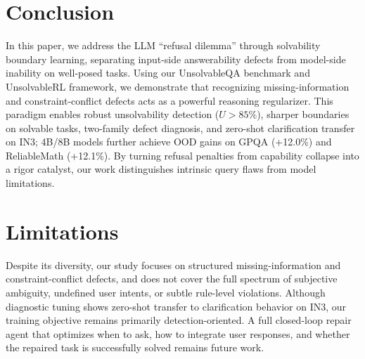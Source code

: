 \section{Conclusion}

In this paper, we address the LLM ``refusal dilemma'' through solvability boundary learning, separating input-side answerability defects from model-side inability on well-posed tasks. Using our UnsolvableQA benchmark and UnsolvableRL framework, we demonstrate that recognizing missing-information and constraint-conflict defects acts as a powerful {reasoning regularizer}. This paradigm enables robust unsolvability detection ($U > 85\%$), sharper boundaries on solvable tasks, two-family defect diagnosis, and zero-shot clarification transfer on IN3; 4B/8B models further achieve OOD gains on GPQA (+12.0\%) and ReliableMath (+12.1\%). By turning refusal penalties from capability collapse into a rigor catalyst, our work distinguishes intrinsic query flaws from model limitations.

\section*{Limitations}
Despite its diversity, our study focuses on structured missing-information and constraint-conflict defects, and does not cover the full spectrum of subjective ambiguity, undefined user intents, or subtle rule-level violations. Although diagnostic tuning shows zero-shot transfer to clarification behavior on IN3, our training objective remains primarily detection-oriented. A full closed-loop repair agent that optimizes when to ask, how to integrate user responses, and whether the repaired task is successfully solved remains future work.%
